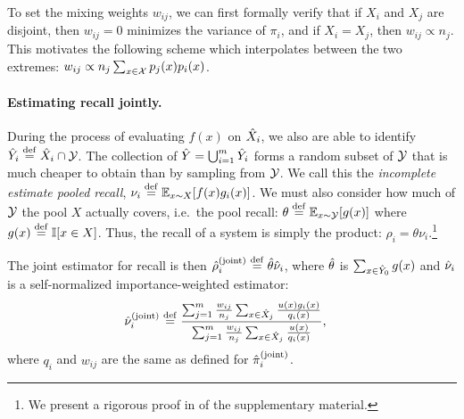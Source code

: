 To set the mixing weights $w_{ij}$, we can first formally verify that
if $X_i$ and $X_j$ are disjoint, then $w_{ij} = 0$ minimizes the variance of $\pi_i$,
and if $X_i = X_j$, then $w_{ij} \propto n_{j}$.
This motivates the following scheme which interpolates between the two extremes:
$w_{ij} \propto n_{j} \sum_{x \in \mathcal{X}} p_j(x) p_i(x)$.

\paragraph{Estimating recall jointly.}
During the process of evaluating $f(x)$ on ${\hat{X}}_i$, we also are able to identify ${\hat{Y}}_i \stackrel{\rm def}{=} {\hat{X}}_i \cap \mathcal{Y}$.
The collection of ${\hat{Y}} = \bigcup_{i=1}^m {\hat{Y}}_i$ forms a random subset of $\mathcal{Y}$ that is much cheaper to obtain than by sampling from $\mathcal{Y}$.
We call this the \emph{incomplete estimate pooled recall},
$\nu_i \stackrel{\rm def}{=} \mathbb{E}_{x \sim X}[f(x) g_i(x)]$.
We must also consider how much of $\mathcal{Y}$ the pool $X$ actually covers, i.e.\ the pool recall: $\theta \stackrel{\rm def}{=} \mathbb{E}_{x \sim \mathcal{Y}}[g(x)]$ where $g(x) \stackrel{\rm def}{=} \mathbb{I}[x \in X]$.
Thus, the recall of a system is simply the product: $\rho_i = \theta \nu_i$.\footnote{%
We present a rigorous proof in  of the supplementary material.}

The joint estimator for recall is then ${\hat{\rho}}_i^{\text{(joint)}} \stackrel{\rm def}{=} {\hat{\theta}}{\hat{\nu}}_i$, where ${\hat{\theta}}$ is $\sum_{x \in {\hat{Y}}_0} g(x)$ and ${\hat{\nu}}_i$ is a self-normalized importance-weighted estimator:
\begin{align*}
  {\hat{\nu}}_i^{\text{(joint)}} &\stackrel{\rm def}{=} \frac{\sum_{j=1}^m \frac{w_{ij}}{n_j} \sum_{x \in {\hat{X}}_j} \frac{u(x) g_i(x)}{q_i(x)}}{\sum_{j=1}^m \frac{w_{ij}}{n_j} \sum_{x \in {\hat{X}}_j} \frac{u(x)}{q_i(x)}},
\end{align*}
where $q_i$ and $w_{ij}$ are the same as defined for ${\hat{\pi}}_i^{\text{(joint)}}$.

